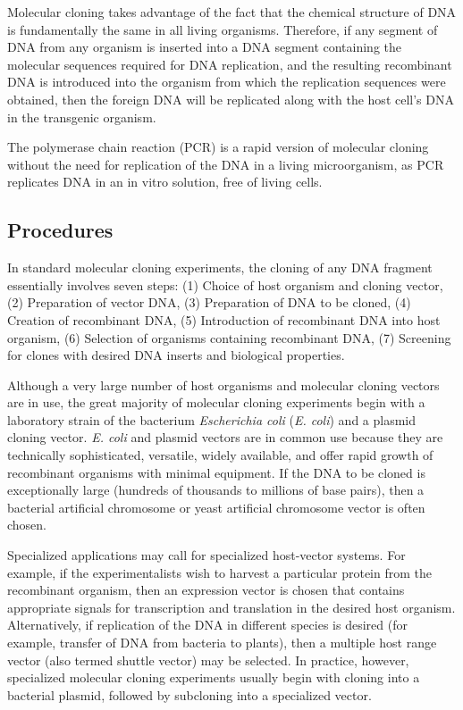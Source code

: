 Molecular cloning takes advantage of the fact that the chemical structure of DNA is fundamentally the same in all living organisms. Therefore, if any segment of DNA from any organism is inserted into a DNA segment containing the molecular sequences required for DNA replication, and the resulting recombinant DNA is introduced into the organism from which the replication sequences were obtained, then the foreign DNA will be replicated along with the host cell's DNA in the transgenic organism.

The polymerase chain reaction (PCR) is a rapid version of molecular cloning without the need for replication of the DNA in a living microorganism, as PCR replicates DNA in an in vitro solution, free of living cells.

\hypertarget{procedures}{%
\subsection{Procedures}\label{procedures}}

In standard molecular cloning experiments, the cloning of any DNA fragment essentially involves seven steps: (1) Choice of host organism and cloning vector, (2) Preparation of vector DNA, (3) Preparation of DNA to be cloned, (4) Creation of recombinant DNA, (5) Introduction of recombinant DNA into host organism, (6) Selection of organisms containing recombinant DNA, (7) Screening for clones with desired DNA inserts and biological properties.

Although a very large number of host organisms and molecular cloning vectors are in use, the great majority of molecular cloning experiments begin with a laboratory strain of the bacterium \emph{Escherichia coli }(\emph{E. coli}) and a plasmid cloning vector. \emph{E. coli} and plasmid vectors are in common use because they are technically sophisticated, versatile, widely available, and offer rapid growth of recombinant organisms with minimal equipment. If the DNA to be cloned is exceptionally large (hundreds of thousands to millions of base pairs), then a bacterial artificial chromosome or yeast artificial chromosome vector is often chosen.

Specialized applications may call for specialized host-vector systems. For example, if the experimentalists wish to harvest a particular protein from the recombinant organism, then an expression vector is chosen that contains appropriate signals for transcription and translation in the desired host organism. Alternatively, if replication of the DNA in different species is desired (for example, transfer of DNA from bacteria to plants), then a multiple host range vector (also termed shuttle vector) may be selected. In practice, however, specialized molecular cloning experiments usually begin with cloning into a bacterial plasmid, followed by subcloning into a specialized vector.

